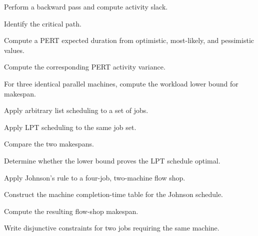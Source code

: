 \begin{exercise}[3]
Perform a backward pass and compute activity slack.
\end{exercise}

\begin{exercise}[3]
Identify the critical path.
\end{exercise}

\begin{exercise}[3]
Compute a PERT expected duration from optimistic, most-likely, and
pessimistic values.
\end{exercise}

\begin{exercise}[3]
Compute the corresponding PERT activity variance.
\end{exercise}

\begin{exercise}[3]
For three identical parallel machines, compute the workload lower bound
for makespan.
\end{exercise}

\begin{exercise}[3]
Apply arbitrary list scheduling to a set of jobs.
\end{exercise}

\begin{exercise}[3]
Apply LPT scheduling to the same job set.
\end{exercise}

\begin{exercise}[3]
Compare the two makespans.
\end{exercise}

\begin{exercise}[3]
Determine whether the lower bound proves the LPT schedule optimal.
\end{exercise}

\begin{exercise}[3]
Apply Johnson's rule to a four-job, two-machine flow shop.
\end{exercise}

\begin{exercise}[3]
Construct the machine completion-time table for the Johnson schedule.
\end{exercise}

\begin{exercise}[3]
Compute the resulting flow-shop makespan.
\end{exercise}

\begin{exercise}[3]
Write disjunctive constraints for two jobs requiring the same machine.
\end{exercise}

